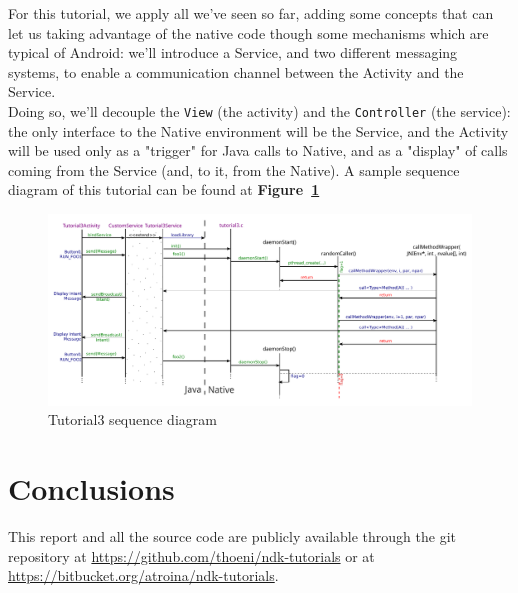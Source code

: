 \documentclass[a4paper,10pt]{article}
\newcommand{\keyword}[1]{\texttt{#1}}
\newcommand{\reff}[1]{\textbf{Figure~\ref{#1}}}
\begin{document}
\begin{multicols}{2}
For this tutorial, we apply all we've seen so far, adding some concepts that can
let us taking advantage of the native code though some mechanisms which are
typical of Android: we'll introduce a Service, and two different messaging
systems, to enable a communication channel between the Activity and the Service.
\\Doing so, we'll decouple the \keyword{View} (the activity) and the \keyword{Controller} (the service): the
only interface to the Native environment will be the Service, and the Activity
will be used only as a "trigger" for Java calls to Native, and as a "display" of calls coming from the Service (and, to it, from the Native). A sample sequence diagram of this tutorial can be found at \reff{fig:tut3-seq}

\begin{figure}[b]
 \includegraphics[width=17cm]{./figures/sequence_t3.pdf}
 \caption{Tutorial3 sequence diagram}
 \label{fig:tut3-seq}
\end{figure}


\section{Conclusions}

This report and all the source code are publicly available through the git
repository at \url{https://github.com/thoeni/ndk-tutorials} or at \url{https://bitbucket.org/atroina/ndk-tutorials}.

\nocite{liang1999jni}
\nocite{marakanajni}
\nocite{learningandroid}
\nocite{programmingandroid}




\end{multicols}
\end{document}
